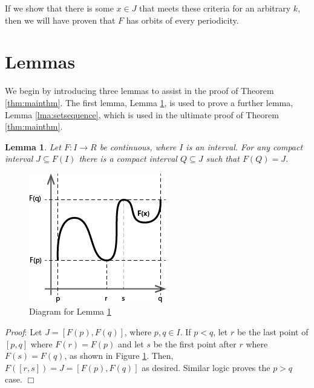 \documentclass[12pt]{IEEEtran}
\newtheorem{lma}{Lemma}
\begin{document}
If we show that there is some $x \in J$ that meets these criteria for an arbitrary $k$, then we will have proven that $F$ has orbits of every periodicity.



\section{Lemmas}

We begin by introducing three lemmas to assist in the proof of Theorem \ref{thm:mainthm}. The first lemma, Lemma \ref{lma:cont_comp}, is used to prove a further lemma, Lemma \ref{lma:setsequence}, which is used in the ultimate proof of Theorem \ref{thm:mainthm}.

\begin{lma}
\label{lma:cont_comp}
	Let $F : I \rightarrow R$ be continuous, where $I$ is an interval. For any compact interval $J \subseteq F(I)$ there is a compact interval $Q \subseteq J$ such that $F(Q) = J$.
\end{lma}

\begin{figure}
	\begin{center}
		\includegraphics{img/continuity_graph.png}
		\caption{Diagram for Lemma \ref{lma:cont_comp}}
        \label{fig:continuity_graph}
	\end{center}
\end{figure}

{\it Proof}: Let $J = \left[ F \left( p \right), F \left( q \right) \right]$, where $p, q \in I$. If $p < q$, let $r$ be the last point of $\left[ p, q\right]$ where $F \left( r \right) = F \left( p \right)$ and let $s$ be the first point after $r$ where $F \left( s \right) = F \left( q \right)$, as shown in Figure \ref{fig:continuity_graph}. Then, $F \left( \left[ r, s\right] \right) = J = \left[ F \left( p \right), F \left( q \right) \right]$ as desired. Similar logic proves the $p > q$ case. $\Box$
\\
\end{document}
